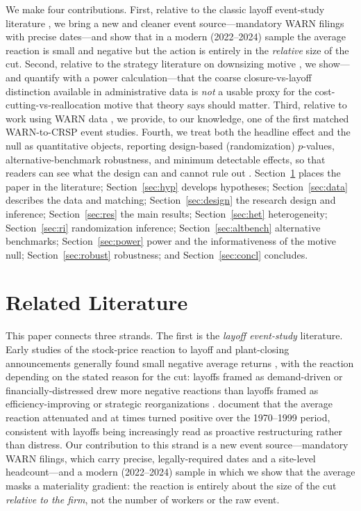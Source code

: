 \documentclass[12pt]{article}
\begin{document}
We make four contributions. First, relative to the classic layoff event-study
literature \citep{worrell1991,palmon1997,chen2001,farber2009}, we bring a new and
cleaner event source---mandatory WARN filings with precise dates---and show that in
a modern (2022--2024) sample the average reaction is small and negative but the
action is entirely in the \emph{relative} size of the cut. Second, relative to the
strategy literature on downsizing motive
\citep{cascio1993,nixon2004,love2005,guthrie2008}, we show---and quantify with a
power calculation---that the coarse closure-vs-layoff distinction available in
administrative data is \emph{not} a usable proxy for the
cost-cutting-vs-reallocation motive that theory says should matter. Third, relative
to work using WARN data \citep{addison1994}, we provide, to our knowledge, one of
the first matched WARN-to-CRSP event studies. Fourth, we treat both the headline
effect and the null as quantitative objects, reporting design-based
(randomization) $p$-values, alternative-benchmark robustness, and minimum
detectable effects, so that readers can see what the design can and cannot rule
out \citep{young2019,abadie2020}. Section~\ref{sec:lit} places the paper in the
literature; Section~\ref{sec:hyp} develops hypotheses; Section~\ref{sec:data}
describes the data and matching; Section~\ref{sec:design} the research design and
inference; Section~\ref{sec:res} the main results; Section~\ref{sec:het}
heterogeneity; Section~\ref{sec:ri} randomization inference;
Section~\ref{sec:altbench} alternative benchmarks; Section~\ref{sec:power} power
and the informativeness of the motive null; Section~\ref{sec:robust} robustness;
and Section~\ref{sec:concl} concludes.

\section{Related Literature}\label{sec:lit}
This paper connects three strands. The first is the \emph{layoff event-study}
literature. Early studies of the stock-price reaction to layoff and plant-closing
announcements generally found small negative average returns
\citep{worrell1991,palmon1997}, with the reaction depending on the stated reason
for the cut: layoffs framed as demand-driven or financially-distressed drew more
negative reactions than layoffs framed as efficiency-improving or strategic
reorganizations \citep{elayan1998,chen2001,nixon2004}. \citet{farber2009} document
that the average reaction attenuated and at times turned positive over the
1970--1999 period, consistent with layoffs being increasingly read as proactive
restructuring rather than distress. Our contribution to this strand is a new event
source---mandatory WARN filings, which carry precise, legally-required dates and a
site-level headcount---and a modern (2022--2024) sample in which we show that the
average masks a materiality gradient: the reaction is entirely about the size of
the cut \emph{relative to the firm}, not the number of workers or the raw event.
\end{document}
